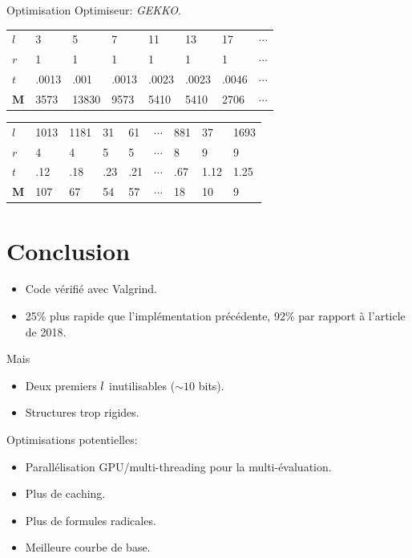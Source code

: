 \documentclass{beamer}
\begin{document}
\begin{frame}{Optimisation}
Optimiseur: \textit{GEKKO}.
\begin{table}[h]
\begin{tabular}{llllllll}
\cline{1-1}
\multicolumn{1}{|l|}{$l$} & 3     & 5     & 7     & 11    & 13    & 17     & $\cdots$   \\ \cline{1-1}
$r$                       & 1     & 1     & 1     & 1     & 1     & 1      & $\cdots$   \\
$t$                       & .0013 & .001  & .0013 & .0023 & .0023 & .0046  & $\cdots$   \\
$\mathbf{M}$              & 3573  & 13830 & 9573  & 5410  & 5410  & 2706   & $\cdots$
\end{tabular}
\end{table}

\begin{table}[h]
\begin{tabular}{lllllllll}
\cline{1-1}
\multicolumn{1}{|l|}{$l$} & 1013 & 1181 & 31  & 61  & $\cdots$ &  881 & 37   & 1693 \\ \cline{1-1}
$r$                       & 4    & 4    & 5   & 5   & $\cdots$ &  8   & 9    & 9    \\
$t$                       & .12  & .18  & .23 & .21 & $\cdots$ &  .67 & 1.12 & 1.25 \\
$\mathbf{M}$              & 107  & 67   & 54  & 57  & $\cdots$ &  18  & 10   & 9
\end{tabular}
\end{table}
\end{frame}


\section*{Conclusion}
\begin{frame}
	\begin{itemize}
		\item Code v\'erifi\'e avec Valgrind.
		\item 25\% plus rapide que l'impl\'ementation pr\'ec\'edente, 92\% par rapport \`a l'article de 2018.
	\end{itemize}
	Mais
	\begin{itemize}
		\item Deux premiers $\mathnormal{l}$ inutilisables ($\sim 10$ bits).
		\item Structures trop rigides.
	\end{itemize}
	Optimisations potentielles:
	\begin{itemize}
		\item Parall\'elisation GPU/multi-threading pour la multi-\'evaluation.
		\item Plus de caching.
		\item Plus de formules radicales.
		\item Meilleure courbe de base.
	\end{itemize}
\end{frame}
\end{document}
